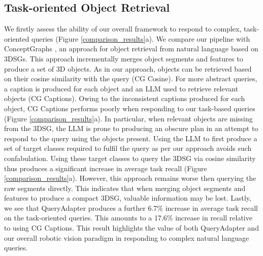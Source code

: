 \subsection{Task-oriented Object Retrieval}
We firstly assess the ability of our overall framework to respond to complex, task-oriented queries (Figure \ref{comparison_results}a). We compare our pipeline with ConceptGraphs \cite{conceptgraphs}, an approach for object retrieval from natural language based on 3DSGs. This approach incrementally merges object segments and features to produce a set of 3D objects. As in our approach, objects can be retrieved based on their cosine similarity with the query (CG Cosine). For more abstract queries, a caption is produced for each object and an LLM used to retrieve relevant objects (CG Captions). Owing to the inconsistent captions produced for each object, CG Captions performs poorly when responding to our task-based queries (Figure \ref{comparison_results}a). In particular, when relevant objects are missing from the 3DSG, the LLM is prone to producing an obscure plan in an attempt to respond to the query using the objects present. Using the LLM to first produce a set of target classes required to fulfil the query as per our approach avoids such confabulation. Using these target classes to query the 3DSG via cosine similarity thus produces a significant increase in average task recall (Figure \ref{comparison_results}a). However, this approach remains worse then querying the raw segments directly. This indicates that when merging object segments and features to produce a compact 3DSG, valuable information may be lost. Lastly, we see that QueryAdapter produces a further 6.7\% increase in average task recall on the task-oriented queries. This amounts to a 17.6\% increase in recall relative to using CG Captions. This result highlights the value of both QueryAdapter and our overall robotic vision paradigm in responding to complex natural language queries.

\vspace{-0.3em}
